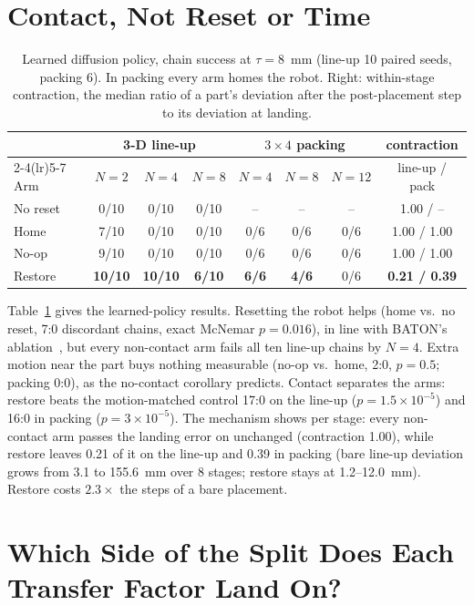 \documentclass{article}
\begin{document}
\section{Contact, Not Reset or Time}
\label{sec:learned}
\begin{table}[t]
\centering
\caption{Learned diffusion policy, chain success at $\tau=8$~mm (line-up 10 paired seeds, packing 6). In packing
every arm homes the robot. Right: within-stage contraction, the median ratio of a part's deviation after the
post-placement step to its deviation at landing.}
\label{tab:main}
\small
\begin{tabular}{lccccccc}
\toprule
& \multicolumn{3}{c}{3-D line-up} & \multicolumn{3}{c}{$3\times4$ packing} & contraction \\
\cmidrule(lr){2-4}\cmidrule(lr){5-7}
Arm & $N{=}2$ & $N{=}4$ & $N{=}8$ & $N{=}4$ & $N{=}8$ & $N{=}12$ & line-up / pack \\
\midrule
No reset & 0/10 & 0/10 & 0/10 & -- & -- & -- & 1.00 / -- \\
Home     & 7/10 & 0/10 & 0/10 & 0/6 & 0/6 & 0/6 & 1.00 / 1.00 \\
No-op    & 9/10 & 0/10 & 0/10 & 0/6 & 0/6 & 0/6 & 1.00 / 1.00 \\
Restore  & \textbf{10/10} & \textbf{10/10} & \textbf{6/10} & \textbf{6/6} & \textbf{4/6} & 0/6 & \textbf{0.21 / 0.39} \\
\bottomrule
\end{tabular}
\end{table}
Table~\ref{tab:main} gives the learned-policy results. Resetting the robot helps (home vs.\ no reset, 7:0
discordant chains, exact McNemar $p=0.016$), in line with BATON's ablation~\citep{baton2026}, but every non-contact
arm fails all ten line-up chains by $N=4$. Extra motion near the part buys nothing measurable (no-op vs.\ home, 2:0,
$p=0.5$; packing 0:0), as the no-contact corollary predicts. Contact separates the arms: restore beats the
motion-matched control 17:0 on the line-up ($p=1.5\times10^{-5}$) and 16:0 in packing ($p=3\times10^{-5}$). The
mechanism shows per stage: every non-contact arm passes the landing error on unchanged (contraction 1.00), while
restore leaves 0.21 of it on the line-up and 0.39 in packing (bare line-up deviation grows from 3.1 to 155.6~mm over
8 stages; restore stays at 1.2--12.0~mm). Restore costs $2.3\times$ the steps of a bare placement.

\section{Which Side of the Split Does Each Transfer Factor Land On?}
\label{sec:transfer}
\end{document}
